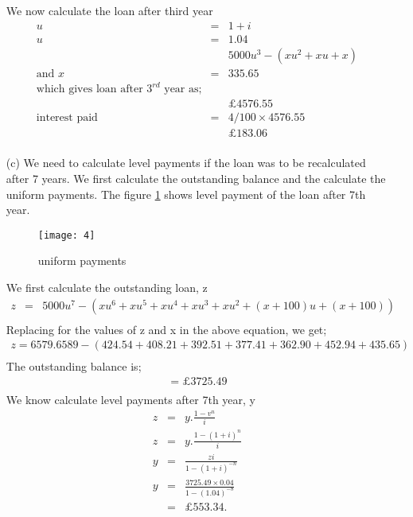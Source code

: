 \documentclass[12pt,a4paper]{article}
\begin{document}
\begin{enumerate}
We now calculate the loan after third year
\begin{eqnarray*}
u&=&1+i\\
u&=&1.04\\
&&5000 u^3-(xu^2+xu+x)\\
 \text{and}\, \,x&=& 335.65\\ \text{which gives loan after $3^{rd}$ year as;}\\
&&\pounds 4576.55\\
\text{interest paid} &=& 4/100 \times 4576.55\\
&&\pounds 183.06\\
\end{eqnarray*}
\item[(c)]
We need to calculate level payments if the loan was to be recalculated after 7 years. We first calculate the outstanding balance and the calculate the uniform payments. The figure \ref{fig 5} shows level payment of the loan after 7th year.
\begin{figure}[H]
\texttt{[image: 4]}
\centering
\caption{uniform payments}
\label{fig 5}
\end{figure}
We first calculate the outstanding loan, z
\begin{eqnarray*}
z&=& 5000u^7-(xu^6+xu^5+xu^4+xu^3+xu^2+(x+100)u+(x+100))\\
\end{eqnarray*}
Replacing for the values of z and x in the above equation, we get;
\begin{eqnarray*}
z=6579.6589-(424.54+408.21+392.51+377.41+362.90+452.94+435.65)\\
\end{eqnarray*}
The outstanding balance is;
\begin{eqnarray*}
=\pounds 3725.49\\
\end{eqnarray*}
We know calculate level payments after 7th year, y
\begin{eqnarray*}
z&=& y.\frac{1-v^n}{i}\\
z&=&y.\frac{1-(1+i)^n}{i}\\
y&=&\frac{zi}{1-(1+i)^{-n}}\\
y&=& \frac{3725.49 \times 0.04}{1-(1.04)^{-8}}\\
&=& \pounds 553.34.
\end{eqnarray*}
\end{enumerate}
\end{document}
